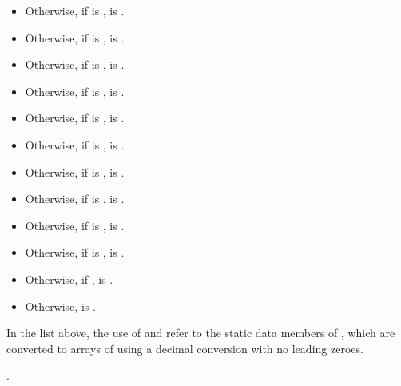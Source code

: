 \begin{itemdescr}
\begin{itemize}
\item
Otherwise, if  is ,
 is .

\item
Otherwise, if  is ,
 is .

\item
Otherwise, if  is ,
 is .

\item
Otherwise, if  is ,
 is .

\item
Otherwise, if  is ,
 is .

\item
Otherwise, if  is ,
 is .

\item
Otherwise, if  is ,
 is .

\item
Otherwise, if  is ,
 is .

\item
Otherwise, if  is ,
 is .

\item
Otherwise, if  is ,
 is .

\item
Otherwise, if ,
 is .

\item
Otherwise,  is
.
\end{itemize}

In the list above,
the use of  and 
refer to the static data members of ,
which are converted to arrays of  using a decimal conversion with no leading zeroes.

\pnum
\returns
{}.
\end{itemdescr}

